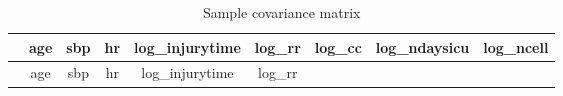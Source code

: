 \documentclass[
]{article}
\begin{document}
\begin{longtable}[]{@{}lcccccccc@{}}
\caption{Sample covariance matrix}\tabularnewline
\toprule
\begin{minipage}[b]{0.09\columnwidth}\raggedright
\strut
\end{minipage} & \begin{minipage}[b]{0.08\columnwidth}\centering
age\strut
\end{minipage} & \begin{minipage}[b]{0.09\columnwidth}\centering
sbp\strut
\end{minipage} & \begin{minipage}[b]{0.09\columnwidth}\centering
hr\strut
\end{minipage} & \begin{minipage}[b]{0.10\columnwidth}\centering
log\_injurytime\strut
\end{minipage} & \begin{minipage}[b]{0.07\columnwidth}\centering
log\_rr\strut
\end{minipage} & \begin{minipage}[b]{0.07\columnwidth}\centering
log\_cc\strut
\end{minipage} & \begin{minipage}[b]{0.09\columnwidth}\centering
log\_ndaysicu\strut
\end{minipage} & \begin{minipage}[b]{0.07\columnwidth}\centering
log\_ncell\strut
\end{minipage}\tabularnewline
\midrule
\endfirsthead
\toprule
\begin{minipage}[b]{0.09\columnwidth}\raggedright
\strut
\end{minipage} & \begin{minipage}[b]{0.08\columnwidth}\centering
age\strut
\end{minipage} & \begin{minipage}[b]{0.09\columnwidth}\centering
sbp\strut
\end{minipage} & \begin{minipage}[b]{0.09\columnwidth}\centering
hr\strut
\end{minipage} & \begin{minipage}[b]{0.10\columnwidth}\centering
log\_injurytime\strut
\end{minipage} & \begin{minipage}[b]{0.07\columnwidth}\centering
log\_rr\strut
\end{minipage} & \begin{minipage}[b]{0.07\columnwidth}\centering

\end{minipage}
\end{longtable}
\end{document}
